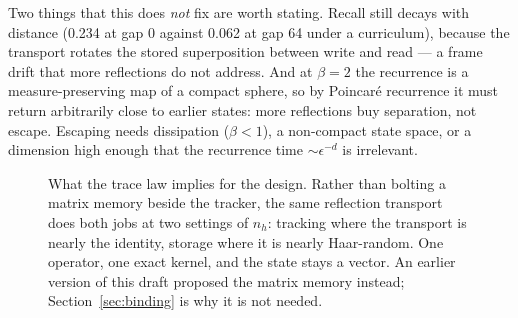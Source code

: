 \documentclass[10pt]{article}
\newcommand{\bz}{\mathbf{z}}
\begin{document}
Two things that this does \emph{not} fix are worth stating. Recall still decays with distance
(0.234 at gap 0 against 0.062 at gap 64 under a curriculum), because the transport rotates the stored
superposition between write and read --- a frame drift that more reflections do not address. And at
$\beta=2$ the recurrence is a measure-preserving map of a compact sphere, so by Poincar\'e recurrence
it must return arbitrarily close to earlier states: more reflections buy separation, not escape.
Escaping needs dissipation ($\beta<1$), a non-compact state space, or a dimension high enough that the
recurrence time $\sim\epsilon^{-d}$ is irrelevant.

\begin{figure}[t]
\centering
{}
\caption{What the trace law implies for the design. Rather than bolting a matrix memory beside the
tracker, the same reflection transport does both jobs at two settings of $n_h$: tracking where the
transport is nearly the identity, storage where it is nearly Haar-random. One operator, one exact
kernel, and the state stays a vector. An earlier version of this draft proposed the matrix memory
instead; Section~\ref{sec:binding} is why it is not needed.}
\label{fig:memory}
\end{figure}
\end{document}
